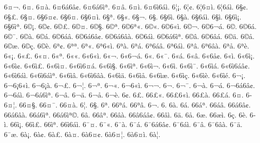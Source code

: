 {6^^a4^^ac. 6^^a4^^ad. 6^^a4^^e0. 6^^a46^^e16^^e2^^a2. 6^^a46^^e16^^ec^^aa. 6^^a4^^e2. 6^^a4^^ec. 6^^a46^^ec6^^e1^^ec. 
6^^a6^^a1. 6^^a6^^a2. 6^^a66^^a4^^ec. 6^^a66^^e1^^ec. 6^^a7^^a2. 6^^a7^^a3. 6^^a7^^a4. 6^^a76^^a4^^a2. 
6^^a76^^a4^^ad. 6^^a76^^a4^^ec. 6^^a7^^aa. 6^^a7^^ab. 6^^a7^^ac. 6^^a7^^ad. 6^^a76^^ad^^ec. 6^^a7^^e0. 
6^^a76^^e1^^ec. 6^^a7^^ec. 6^^a76^^ec^^a1. 6^^a76^^ec^^aa. 6^^a9^^a1. 6^^a9^^a2. 6^^a9^^a3. 6^^a9^^a4. 
6^^a9^^a7. 6^^a9^^aa. 6^^a96^^aa^^ab. 6^^a9^^ab. 6^^a96^^ab^^ec. 6^^a9^^ac. 6^^a96^^ac^^e1. 6^^a9^^ad. 
6^^a96^^ad^^e1. 6^^a9^^af. 6^^a9^^e0. 6^^a9^^e1. 6^^a96^^e1^^e2. 6^^a96^^e16^^e2^^a2. 6^^a96^^e16^^e2^^e0. 6^^a96^^e1^^ec. 
6^^a96^^e16^^ec^^aa. 6^^a9^^e2. 6^^a96^^e2^^e1. 6^^a9^^e4. 6^^a9^^e5. 6^^a9^^e6. 6^^a9^^e7. 6^^a9^^e8. 
6^^aa^^a2. 6^^aa^^aa. 6^^aa^^ab. 6^^aa6^^ab^^ec. 6^^aa^^e0. 6^^aa^^e1. 6^^aa6^^e1^^e2. 6^^aa6^^e1^^ec. 
6^^aa^^e2. 6^^aa6^^e2^^e0. 6^^aa^^e5. 6^^aa^^e8. 6^^ab^^a1. 6^^ab^^a3. 6^^ab^^a4. 6^^ab^^aa. 
6^^ab^^ab. 6^^ab6^^ab^^ec. 6^^ab^^ac. 6^^ab6^^ac^^e1. 6^^ab^^ad. 6^^ab^^af. 6^^ab^^e1. 6^^ab^^e2. 
6^^ab6^^e5^^a2. 6^^ab^^ec. 6^^ab6^^ec^^a1. 6^^ab6^^ec^^a2. 6^^ab6^^ec^^a3. 6^^ab6^^ec^^a4. 6^^ab6^^ec6^^a4^^e1. 6^^ab6^^ec^^a7. 
6^^ab6^^ec^^aa. 6^^ab6^^ec^^ac. 6^^ab6^^ec^^ad. 6^^ab6^^ec^^af. 6^^ab6^^ec^^e1. 6^^ab6^^ec6^^e1^^e2^^a2. 6^^ab6^^ec6^^e1^^ec. 6^^ab6^^ec6^^e1^^ec^^aa. 
6^^ab6^^ec^^e2. 6^^ab6^^ec6^^e2^^e0. 6^^ab6^^ec^^e4. 6^^ab6^^ec^^e5. 6^^ab6^^ec^^e6. 6^^ab6^^ec^^e7. 6^^ab6^^ec^^e8. 6^^ab6^^ec^^e9. 
6^^ac^^a1. 6^^ac6^^a16^^ab^^ec. 6^^ac6^^a1^^e0. 6^^ac^^a3. 6^^ac^^a6. 6^^ac^^aa. 6^^ac^^ab. 6^^ac6^^ab^^ec. 
6^^ac^^ac. 6^^ac^^ad. 6^^ac^^af. 6^^ac^^e0. 6^^ac^^e1. 6^^ac6^^e16^^e2^^a2. 6^^ac6^^e1^^ec. 6^^ac6^^e16^^ec^^aa. 
6^^ac^^e2. 6^^ac^^e4. 6^^ac^^e5. 6^^ac^^e8. 6^^ad^^a2. 6^^ad^^a3. 6^^ad6^^a3^^ab. 6^^ad6^^a36^^ab^^ec. 
6^^ad6^^a3^^e0. 6^^ad6^^a3^^e1. 6^^ad^^a4. 6^^ad6^^a4^^a6. 6^^ad6^^a4^^a7. 6^^ad6^^a4^^af. 6^^ad6^^a4^^e0. 6^^ad^^a6. 
6^^ad^^a7. 6^^ad^^aa. 6^^ad6^^aa^^e1. 6^^ad6^^aa^^e2. 6^^ad^^ac. 6^^ad^^ad. 6^^ad^^e0. 6^^ad^^e1. 
6^^ad6^^e1^^aa. 6^^ad6^^e1^^e2. 6^^ad6^^e16^^e2^^a2. 6^^ad6^^e16^^e2^^e0. 6^^ad6^^e16^^ec^^aa. 6^^ad6^^e16^^ec^^aa^^a9. 6^^ad^^e2. 6^^ad6^^e2^^aa. 
6^^ad6^^e2^^e0. 6^^ad6^^e26^^e1^^e2^^a2. 6^^ad6^^e2^^ec. 6^^ad^^e4. 6^^ad^^e5. 6^^ad^^e6. 6^^ad6^^e6^^ec. 6^^ad^^e7. 
6^^ad^^e8. 6^^ad^^ec. 6^^ad6^^ec^^a1. 6^^ad6^^ec^^a3. 6^^ad6^^ec^^aa. 6^^ad6^^ec6^^e1^^ec. 6^^af^^a4. 6^^af^^ab. 
6^^af^^e0. 6^^af^^e1. 6^^af6^^e16^^e2^^a2. 6^^af6^^e1^^ec. 6^^af^^e2. 6^^af6^^e2^^e0. 6^^af^^e4. 6^^af^^e6. 
6^^e0^^a1. 6^^e0^^a2. 6^^e0^^a3. 6^^e0^^a4. 6^^e06^^a4^^a2. 6^^e06^^a4^^a6. 6^^e06^^a4^^ec. 6^^e0^^a6. 
}

